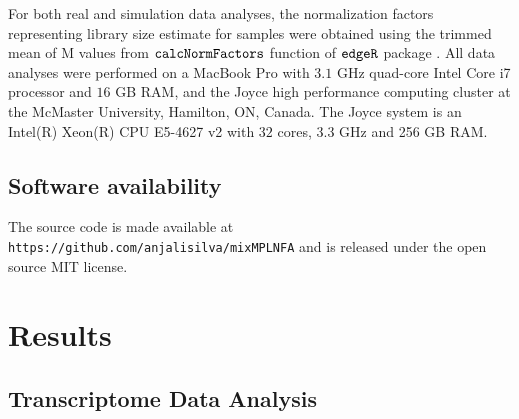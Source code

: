 \documentclass[12pt]{article}
\begin{document}
\begin{table}[h!]
\centering
\caption{Various settings used in the simulation study for PMPLNFA.}
\label{settings_simstudy}
\end{table}

For both real and simulation data analyses, the normalization factors representing library size estimate for samples were obtained using the trimmed mean of M values from ${\tt calcNormFactors}$ function of ${\tt edgeR}$ package \citep{robinson2010, mccarthy2012}. All data analyses were performed on a MacBook Pro with $3.1$ GHz quad-core Intel Core i7 processor and $16$ GB RAM, and the Joyce high performance computing cluster at the McMaster University, Hamilton, ON, Canada. The Joyce system is an Intel(R) Xeon(R) CPU E5-4627 v2 with $32$ cores, $3.3$ GHz and 256 GB RAM.

\subsection{Software availability}
The source code is made available at \texttt{https://github.com/anjalisilva/mixMPLNFA} and is released under the open source MIT license.

\section{Results}
\subsection{Transcriptome Data Analysis} 
\end{document}
